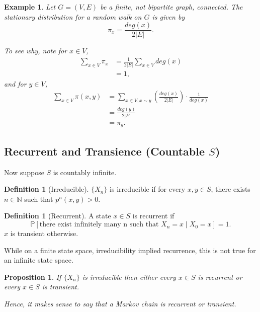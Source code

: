 \documentclass{tufte-handout}
\newcommand*\N{\mathbb{N}}
\renewcommand*\P{\mathbb{P}}
\newtheorem{ex}[thm]{Example}
\newtheorem{prop}[thm]{Proposition}
\theoremstyle{definition}
\newtheorem{defn}[thm]{Definition}
\begin{document}
\begin{ex}
	Let $G = (V,E)$ be a finite, not bipartite graph,  connected. The stationary distribution for a random walk on $G$ is given by \[
		\pi_x = \frac{deg(x)}{2 \left| E \right|}
	.\] 

	To see why, note for $x \in V$,
	\begin{align*}
		\sum\limits_{x \in V}^{} \pi_x &= \frac{1}{2 \left| E \right|} \sum\limits_{x \in V}^{} deg(x) \\
									   &= 1
	,\end{align*} and for $y \in V$,
	\begin{align*}
		\sum\limits_{x \in V}^{} \pi(x,y) &= \sum\limits_{x \in V, x \sim y}^{} \left( \frac{deg(x)}{2 \left| E \right|} \right) \cdot \frac{1}{deg(x)} \\
										  &= \frac{deg(y)}{2 \left| E \right|} \\
										  &= \pi_y
	.\end{align*}
\end{ex}

\subsection{Recurrent and Transience (Countable $S$)}

Now suppose $S$ is countably infinite.

\begin{defn}[Irreducible]
	$\{X_n\}$ is irreducible if for every $x,y \in S$, there exists $n \in \N$ such that $p^n(x,y) > 0$.
\end{defn} 

\begin{defn}[Recurrent]
	A state $x\in S$ is recurrent if \[
		\P\left[\text{there exist infinitely many n such that } X_n  = x \mid X_0 = x\right]  = 1
	.\] 
	$x$ is transient otherwise.
\end{defn}

While on a finite state space, irreducibility implied recurrence, this is not true for an infinite state space.

\begin{prop}
	If $\{X_n\}$ is irreducible then either every $x \in S$ is recurrent or every $x \in S$ is transient.

	Hence, it makes sense to say that a Markov chain is recurrent or transient.
\end{prop}
\end{document}
